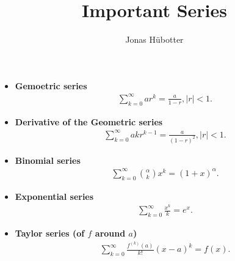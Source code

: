 \documentclass{article}
\title{Important Series}
\author{Jonas Hübotter}
\begin{document}
\maketitle

\begin{itemize}
    \item \textbf{Gemoetric series}
        \begin{align*}
            &\sum_{k=0}^\infty a r^k = \frac{a}{1-r}, \mid r \mid < 1.
        \end{align*}
    \item \textbf{Derivative of the Geometric series}
        \begin{align*}
            &\sum_{k=0}^\infty a k r^{k-1} = \frac{a}{(1-r)^2}, \mid r \mid < 1.
        \end{align*}
    \item \textbf{Binomial series}
        \begin{align*}
            &\sum_{k=0}^\infty {\alpha \choose k} x^k = (1+x)^\alpha.
        \end{align*}
    \item \textbf{Exponential series}
        \begin{align*}
            &\sum_{k=0}^\infty \frac{x^k}{k} = e^x.
        \end{align*}
    \item \textbf{Taylor series (of $f$ around $a$)}
        \begin{align*}
            &\sum_{k=0}^\infty \frac{f^{(k)}(a)}{k!} (x-a)^k = f(x).
        \end{align*}
\end{itemize}
\end{document}
